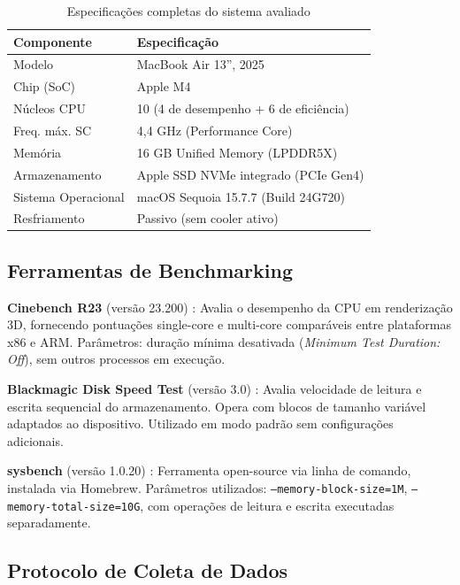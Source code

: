 \documentclass[12pt]{article}
\begin{document}
\begin{table}[ht]
\centering
\caption{Especifica\c{c}\~oes completas do sistema avaliado}
\label{tab:hardware}
\begin{tabular}{ll}
\toprule
\textbf{Componente} & \textbf{Especifica\c{c}\~ao} \\
\midrule
Modelo              & MacBook Air 13'', 2025 \\
Chip (SoC)          & Apple M4 \\
N\'ucleos CPU       & 10 (4 de desempenho + 6 de efici\^encia) \\
Freq. m\'ax. SC     & 4,4 GHz (Performance Core) \\
Mem\'oria           & 16 GB Unified Memory (LPDDR5X) \\
Armazenamento       & Apple SSD NVMe integrado (PCIe Gen4) \\
Sistema Operacional & macOS Sequoia 15.7.7 (Build 24G720) \\
Resfriamento        & Passivo (sem cooler ativo) \\
\bottomrule
\end{tabular}
\end{table}

\subsection{Ferramentas de Benchmarking}

\textbf{Cinebench R23} (vers\~ao 23.200) \cite{maxon2023cinebench}: Avalia
o desempenho da CPU em renderiza\c{c}\~ao 3D, fornecendo pontua\c{c}\~oes
single-core e multi-core comparáveis entre plataformas x86 e ARM. Par\^ametros:
dura\c{c}\~ao m\'inima desativada (\textit{Minimum Test Duration: Off}),
sem outros processos em execu\c{c}\~ao.

\textbf{Blackmagic Disk Speed Test} (vers\~ao 3.0) \cite{blackmagic2023}:
Avalia velocidade de leitura e escrita sequencial do armazenamento. Opera
com blocos de tamanho vari\'avel adaptados ao dispositivo. Utilizado em
modo padr\~ao sem configura\c{c}\~oes adicionais.

\textbf{sysbench} (vers\~ao 1.0.20) \cite{sysbench2023}: Ferramenta
open-source via linha de comando, instalada via Homebrew. Par\^ametros
utilizados: \texttt{--memory-block-size=1M}, \texttt{--memory-total-size=10G},
com opera\c{c}\~oes de leitura e escrita executadas separadamente.

\subsection{Protocolo de Coleta de Dados}
\end{document}
